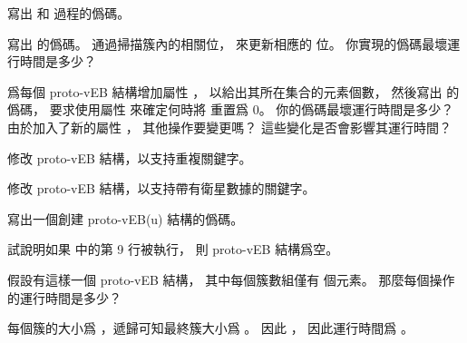 \startsection[
  title={A recursive structure},
]

\startEXERCISE
寫出  和  過程的僞碼。
\stopEXERCISE

\startANSWER
{}
\stopANSWER

\startEXERCISE
寫出  的僞碼。
通過掃描簇內的相關位，
來更新相應的  位。
你實現的僞碼最壞運行時間是多少？
\stopEXERCISE

\startANSWER
{}
\stopANSWER

\startEXERCISE
爲每個 proto-vEB 結構增加屬性 ，
以給出其所在集合的元素個數，
然後寫出  的僞碼，
要求使用屬性  來確定何時將  重置爲 0。
你的僞碼最壞運行時間是多少？
由於加入了新的屬性 ，
其他操作要變更嗎？
這些變化是否會影響其運行時間？
\stopEXERCISE

\startANSWER
{}
\stopANSWER

\startEXERCISE
修改 proto-vEB 結構，以支持重複關鍵字。
\stopEXERCISE

\startANSWER
{}
\stopANSWER

\startEXERCISE
修改 proto-vEB 結構，以支持帶有衛星數據的關鍵字。
\stopEXERCISE

\startANSWER
{}
\stopANSWER

\startEXERCISE
寫出一個創建 proto-vEB(u) 結構的僞碼。
\stopEXERCISE

\startANSWER
{}
\stopANSWER

\startEXERCISE
試說明如果  中的第 9 行被執行，
則 proto-vEB 結構爲空。
\stopEXERCISE

\startANSWER
{}
\stopANSWER

\startEXERCISE
假設有這樣一個 proto-vEB 結構，
其中每個簇數組僅有  個元素。
那麼每個操作的運行時間是多少？
\stopEXERCISE

\startANSWER
每個簇的大小爲 ，遞歸可知最終簇大小爲 。
因此 ，
因此運行時間爲 。
\stopANSWER

\stopsection
